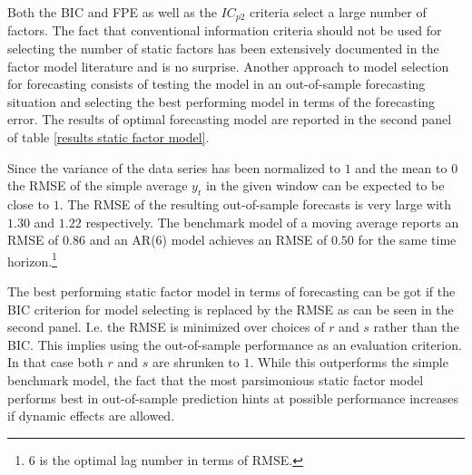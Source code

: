 \documentclass[11pt]{article}
\begin{document}
Both the BIC and FPE as well as the $IC_{p2}$ criteria select a large number of factors. The fact that conventional information criteria should not be used for selecting the number of static factors has been extensively documented in the factor model literature and is no surprise. Another approach to model selection for forecasting consists of testing the model in an out-of-sample forecasting situation and selecting the best performing model in terms of the forecasting error. The results of optimal forecasting model are reported in the second panel of table \ref{results static factor model}.

Since the variance of the data series has been normalized to $1$ and the mean to $0$ the RMSE of the simple average $y_t$ in the given window can be expected to be close to $1$. The RMSE of the resulting out-of-sample forecasts is very large with $1.30$ and $1.22$ respectively. The benchmark model of a moving average reports an RMSE of $0.86$ and an AR(6) model achieves an RMSE of $0.50$ for the same time horizon.\footnote{$6$ is the optimal lag number in terms of RMSE.}

The best performing static factor model in terms of forecasting can be got if the BIC criterion for model selecting is replaced by the RMSE as can be seen in the second panel. I.e. the RMSE is minimized over choices of $r$ and $s$ rather than the BIC. This implies using the out-of-sample performance as an evaluation criterion. In that case both $r$ and $s$ are shrunken to $1$. While this outperforms the simple benchmark model, the fact that the most parsimonious static factor model performs best in out-of-sample prediction hints at possible performance increases if dynamic effects are allowed.
\end{document}
